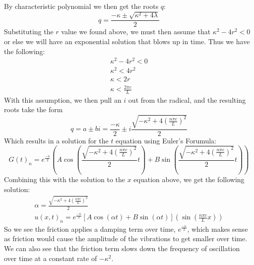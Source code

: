 \documentclass{article}
\begin{document}
By characteristic polynomial we then get the roots $q$:
\begin{equation}
q = \frac{-\kappa \pm \sqrt{\kappa^2 + 4\lambda}}{2}
\end{equation}
Substituting the $r$ value we found above, we must then assume that $\kappa^2 - 4r^2 < 0$ or else we will have an exponential solution that blows up in time. Thus we have the following:
\begin{equation}
\begin{aligned}
\kappa^2 - 4r^2 < 0\\
\kappa^2 < 4r^2\\
\kappa < 2r\\
\kappa < \frac{2\pi c}{L}
\end{aligned}
\end{equation}
With this assumption, we then pull an $i$ out from the radical, and the resulting roots take the form 
\begin{equation}
q = a \pm bi = \frac{-\kappa}{2} \pm i \frac{\sqrt{-\kappa^2 + 4(\frac{n\pi c}{L})^2}}{2} 
\end{equation}
Which results in a solution for the $t$ equation using Euler's Forumula:
\begin{equation}
G(t)_n = e^{\frac{-\kappa}{2}}(A\cos( \frac{\sqrt{-\kappa^2 + 4(\frac{n\pi c}{L})^2}}{2}t) + B\sin( \frac{\sqrt{-\kappa^2 + 4(\frac{n\pi c}{L})^2}}{2}t))
\end{equation}
Combining this with the solution to the $x$ equation above, we get the following solution:
\begin{equation}
\begin{aligned}
\alpha = \frac{\sqrt{-\kappa^2 + 4(\frac{n\pi c}{L})^2}}{2}\\
u(x,t)_n = e^{\frac{-\kappa}{2}}[A\cos( \alpha t) + B\sin( \alpha t)](\sin(\frac{n\pi c}{L}x))
\end{aligned}
\end{equation}
So we see the friction applies a damping term over time, $e^{\frac{-\kappa}{2}}$, which makes sense as friction would cause the amplitude of the vibrations to get smaller over time. We can also see that the friction term slows down the frequency of oscillation over time at a constant rate of $-\kappa^2$.\\
\\
\end{document}
